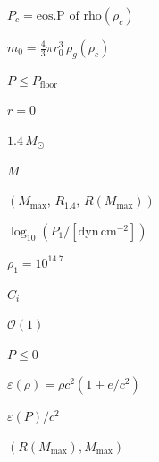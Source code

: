 \documentclass{article}
\begin{document}
$P_c = \mathrm{eos.P\_of\_rho}(\rho_c)$
\pagebreak

$m_0 = \tfrac{4}{3}\pi r_0^{3}\,\rho_g(\rho_c)$
\pagebreak

$P\le P_{\text{floor}}$
\pagebreak

$r=0$
\pagebreak

$1.4\,M_\odot$
\pagebreak

$M$
\pagebreak

$(M_{\max},\,R_{1.4},\,
     R(M_{\max}))$
\pagebreak

$\log_{10}(P_1/[\mathrm{dyn\,cm^{-2}}])$
\pagebreak

$\rho_1 = 10^{14.7}$
\pagebreak

$C_i$
\pagebreak

$\mathcal{O}(1)$
\pagebreak

$P\le 0$
\pagebreak

$\varepsilon(\rho) = \rho c^{2}(1+e/c^{2})$
\pagebreak

$\varepsilon(P)/c^{2}$
\pagebreak

$(R(M_{\max}),M_{\max})$
\pagebreak
\end{document}
